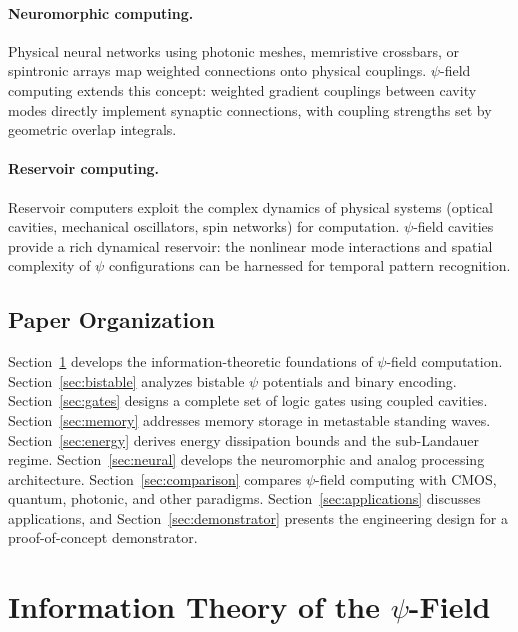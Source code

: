 \documentclass[12pt,a4paper,twoside]{article}
\begin{document}
\paragraph{Neuromorphic computing.}
Physical neural networks using photonic meshes, memristive crossbars, or spintronic arrays map weighted connections onto physical couplings. $\psi$-field computing extends this concept: weighted gradient couplings between cavity modes directly implement synaptic connections, with coupling strengths set by geometric overlap integrals.

\paragraph{Reservoir computing.}
Reservoir computers exploit the complex dynamics of physical systems (optical cavities, mechanical oscillators, spin networks) for computation. $\psi$-field cavities provide a rich dynamical reservoir: the nonlinear mode interactions and spatial complexity of $\psi$ configurations can be harnessed for temporal pattern recognition.

\subsection{Paper Organization}

Section~\ref{sec:info_theory} develops the information-theoretic foundations of $\psi$-field computation. Section~\ref{sec:bistable} analyzes bistable $\psi$ potentials and binary encoding. Section~\ref{sec:gates} designs a complete set of logic gates using coupled cavities. Section~\ref{sec:memory} addresses memory storage in metastable standing waves. Section~\ref{sec:energy} derives energy dissipation bounds and the sub-Landauer regime. Section~\ref{sec:neural} develops the neuromorphic and analog processing architecture. Section~\ref{sec:comparison} compares $\psi$-field computing with CMOS, quantum, photonic, and other paradigms. Section~\ref{sec:applications} discusses applications, and Section~\ref{sec:demonstrator} presents the engineering design for a proof-of-concept demonstrator.

\section{Information Theory of the $\psi$-Field}\label{sec:info_theory}
\end{document}
